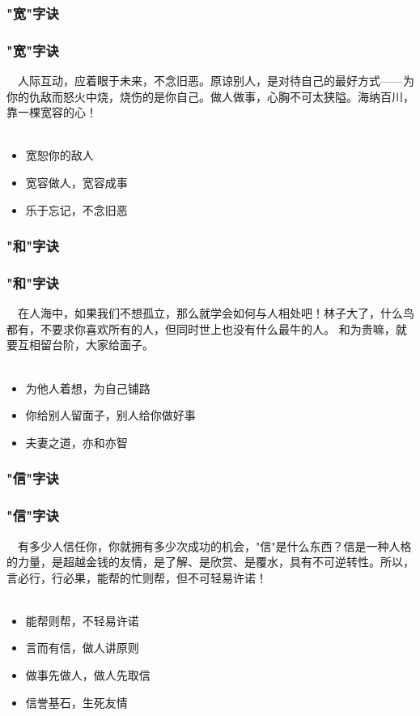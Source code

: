 
\subsubsection{"宽"字诀}
\begin{frame}
\frametitle{"宽"字诀}
\noindent\handr~~人际互动，应着眼于未来，不念旧恶。原谅别人，是对待自己的最好方式——为你的仇敌而怒火中烧，烧伤的是你自己。做人做事，心胸不可太狭隘。海纳百川，靠一棵宽容的心！
~\\
~\\
\begin{itemize}
    \item 宽恕你的敌人
    \item 宽容做人，宽容成事
    \item 乐于忘记，不念旧恶
\end{itemize}
\end{frame}

\subsubsection{"和"字诀}
\begin{frame}
\frametitle{"和"字诀}
\noindent\handr~~在人海中，如果我们不想孤立，那么就学会如何与人相处吧！林子大了，什么鸟都有，不要求你喜欢所有的人，但同时世上也没有什么最牛的人。 和为贵嘛，就要互相留台阶，大家给面子。
~\\
~\\
\begin{itemize}
    \item 为他人着想，为自己铺路
    \item 你给别人留面子，别人给你做好事
    \item 夫妻之道，亦和亦智
\end{itemize}
\end{frame}

\subsubsection{"信"字诀}
\begin{frame}
\frametitle{"信"字诀}
\noindent\handr~~有多少人信任你，你就拥有多少次成功的机会，"信"是什么东西？信是一种人格的力量，是超越金钱的友情，是了解、是欣赏、是覆水，具有不可逆转性。所以，言必行，行必果，能帮的忙则帮，但不可轻易许诺！
~\\
~\\
\begin{itemize}
    \item 能帮则帮，不轻易许诺
    \item 言而有信，做人讲原则
    \item 做事先做人，做人先取信
    \item 信誉基石，生死友情
\end{itemize}
\end{frame}

